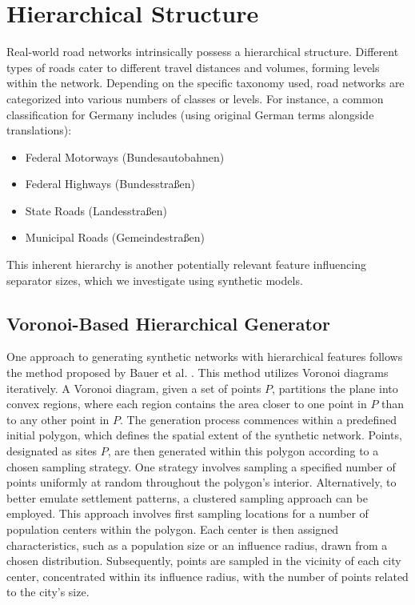 \section{Hierarchical Structure}

Real-world road networks intrinsically possess a hierarchical structure.
Different types of roads cater to different travel distances and volumes, forming levels within the network.
Depending on the specific taxonomy used, road networks are categorized into various numbers of classes or levels.
For instance, a common classification for Germany includes (using original German terms alongside translations):

\begin{itemize}
	\item Federal Motorways (Bundesautobahnen)
	\item Federal Highways (Bundesstraßen)
	\item State Roads (Landesstraßen)
	\item Municipal Roads (Gemeindestraßen)
\end{itemize}

This inherent hierarchy is another potentially relevant feature influencing separator sizes, which we investigate using synthetic models.

\subsection{Voronoi-Based Hierarchical Generator}

One approach to generating synthetic networks with hierarchical features follows the method proposed by Bauer et al. \cite{hutchison_synthetic_2010}.
This method utilizes Voronoi diagrams iteratively.
A Voronoi diagram, given a set of points \(P\), partitions the plane into convex regions, where each region contains the area closer to one point in \(P\) than to any other point in \(P\).
The generation process commences within a predefined initial polygon, which defines the spatial extent of the synthetic network.
Points, designated as sites \(P\), are then generated within this polygon according to a chosen sampling strategy.
One strategy involves sampling a specified number of points uniformly at random throughout the polygon's interior.
Alternatively, to better emulate settlement patterns, a clustered sampling approach can be employed.
This approach involves first sampling locations for a number of population centers within the polygon.
Each center is then assigned characteristics, such as a population size or an influence radius, drawn from a chosen distribution.
Subsequently, points are sampled in the vicinity of each city center, concentrated within its influence radius, with the number of points related to the city's size.

